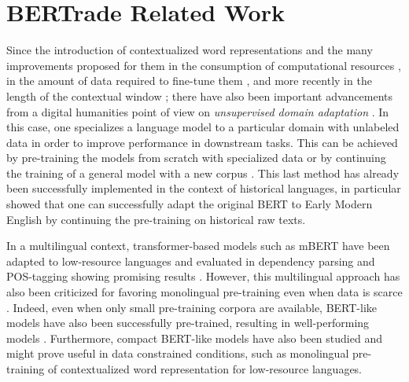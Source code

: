 \section{BERTrade Related Work}

\label{sec-related}
Since the introduction of contextualized word representations \citep{peters-etal-2018-deep,akbik-etal-2018-contextual,devlin-etal-2019-bert} and the many improvements proposed for them in the consumption of computational resources \citep{clark-etal-2020-electra}, in the amount of data required to fine-tune them \citep{raffel-etal-2020-exploring}, and more recently in the length of the contextual window \citep{xiong-etal-2021-nystromformer}; there have also been important advancements from a digital humanities point of view on \emph{unsupervised domain adaptation} \citep{ramponi-plank-2020-neural}. In this case, one specializes a language model to a particular domain with unlabeled data in order to improve performance in downstream tasks. This can be achieved by  pre-training the models from scratch with specialized data \citep{beltagy-etal-2019-scibert} or by continuing the training of a general model with a new corpus \citep{lee-etal-2019-BioBERT, peng-etal-2019-transfer}. This last method has already been successfully implemented in the context of historical languages, in particular \citet{han-eisenstein-2019-unsupervised} showed that one can successfully adapt the original BERT \citep{devlin-etal-2019-bert} to Early Modern English by continuing the pre-training on historical raw texts.

In a multilingual context, transformer-based models such as mBERT have been adapted to low-resource languages and evaluated in dependency parsing and POS-tagging showing promising results \citep{chau-etal-2020-parsing, muller-etal-2021-unseen, gururangan-etal-2020-dont, wang-etal-2020-extending}. However, this multilingual approach has also been criticized for favoring monolingual pre-training even when data is scarce \citep{virtanen-etal-2019-multilingual, ortiz-suarez-etal-2020-monolingual}. Indeed, even when only small pre-training corpora are available, BERT-like models have also been successfully pre-trained, resulting in well-performing models \citep{micheli-etal-2020-importance}. Furthermore, compact BERT-like models have also been studied \citep{turc-etal-2019-well} and might prove useful in data constrained conditions, such as monolingual pre-training of contextualized word representation for low-resource languages.

